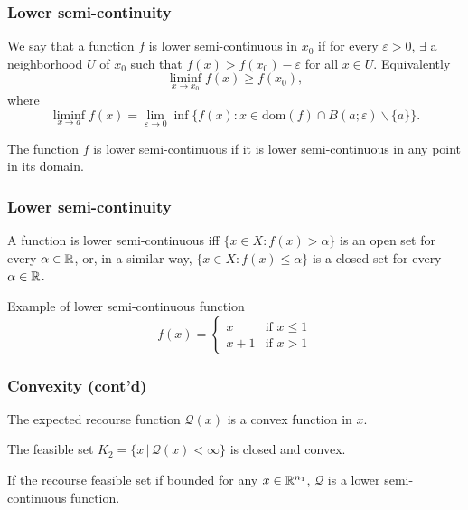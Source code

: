 \documentclass[french]{beamer}
\begin{document}
\begin{frame}
\frametitle{Lower semi-continuity}

We say that a function $f$ is {\blue lower semi-continuous in $x_0$} if for every $\varepsilon > 0$, $\exists$ a neighborhood $U$ of $x_0$ such that $f(x) > f(x_0) - \varepsilon$ for all $x \in U$.
Equivalently
\[
\liminf_{x \to x_{0}} f(x) \geq f(x_{0}),
\]
where
\[
\liminf_{x \to a} f(x) = \lim_{\varepsilon \to 0} \inf \{ f(x) : x
\in \mbox{dom}(f) \cap B(a;\varepsilon) \backslash \{a\} \}.
\]

\mbox{}

The function $f$ is {\blue lower semi-continuous} if it is lower semi-continuous in any point in its domain.

\end{frame}

\begin{frame}
\frametitle{Lower semi-continuity}


A function is lower semi-continuous iff $\lbrace x\in X : f(x) > \alpha \rbrace$ is an open set for every  $\alpha \in \mathbb{R}$, or, in a similar way, $\lbrace x\in X : f(x) \leq \alpha \rbrace$ is a closed set for every $\alpha \in \mathbb{R}$.

\mbox{}

Example of lower semi-continuous function
$$
f(x) =
\begin{cases}
x & \text{if } x \leq 1 \\
x + 1 & \text{if } x > 1
\end{cases}
$$

\end{frame}

\begin{frame}
\frametitle{Convexity (cont'd)}

\begin{corollary}
The expected recourse function $\mathcal{Q}(x)$ is a convex function in $x$.
\end{corollary}

\begin{corollary}
The feasible set $K_2 = \lbrace x \,|\, \mathcal{Q}(x) < \infty \rbrace$ is closed and convex.
\end{corollary}

\begin{corollary}
If the recourse feasible set if bounded for any $x \in \mathbb{R}^{n_1}$, $\mathcal{Q}$ is a lower semi-continuous function.
\end{corollary}

\end{frame}
\end{document}
